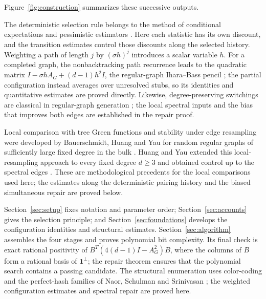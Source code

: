 Figure~\ref{fig:construction} summarizes these successive outputs.


The deterministic selection rule belongs to the method of conditional
expectations and pessimistic estimators \cite{Raghavan1988,WX2008}.
Here each statistic has its own discount, and the transition estimates
control those discounts along the selected history. Weighting a path of
length $j$ by $(\sigma h)^j$ introduces a scalar variable $h$. For a
completed graph, the nonbacktracking path recurrence leads to the quadratic matrix
$I-\sigma hA_G+(d-1)h^2I$, the regular-graph Ihara--Bass pencil
\cite[Sections~6 and~8]{FZ1999}; the partial configuration instead
averages over unresolved stubs, so its identities and quantitative
estimates are proved directly. Likewise, degree-preserving switchings
are classical in regular-graph generation \cite{MW1990}; the local
spectral inputs and the bias that improves both edges are established
in the repair proof.

Local comparison with tree Green functions and stability under edge
resampling were developed by Bauerschmidt, Huang and Yau for random
regular graphs of sufficiently large fixed degree in the bulk
\cite[Sections~2, 7 and~11]{BHY2019}. Huang and Yau extended this
local-resampling approach to every fixed degree $d\ge3$ and obtained
control up to the spectral edges \cite[Sections~1.4, 3 and~5]{HY2024}.
These are methodological precedents for the local comparisons used
here; the estimates along the deterministic pairing history and the
biased simultaneous repair are proved below.

Section~\ref{sec:setup} fixes notation and parameter order;
Section~\ref{sec:accounts} gives the selection principle; and
Section~\ref{sec:foundations} develops the configuration identities
and structural estimates. Section~\ref{sec:algorithm} assembles the
four stages and proves polynomial bit complexity. Its final check is
exact rational positivity of $B^T(4(d-1)I-A_G^2)B$, where the columns
of $B$ form a rational basis of $\mathbf1^\perp$; the repair theorem
ensures that the polynomial search contains a passing candidate.
The structural
enumeration uses color-coding \cite{AYZ1995} and the perfect-hash
families of Naor, Schulman and Srinivasan
\cite[Theorem~3(iii)]{NSS1995}; the weighted configuration estimates
and spectral repair are proved here.
